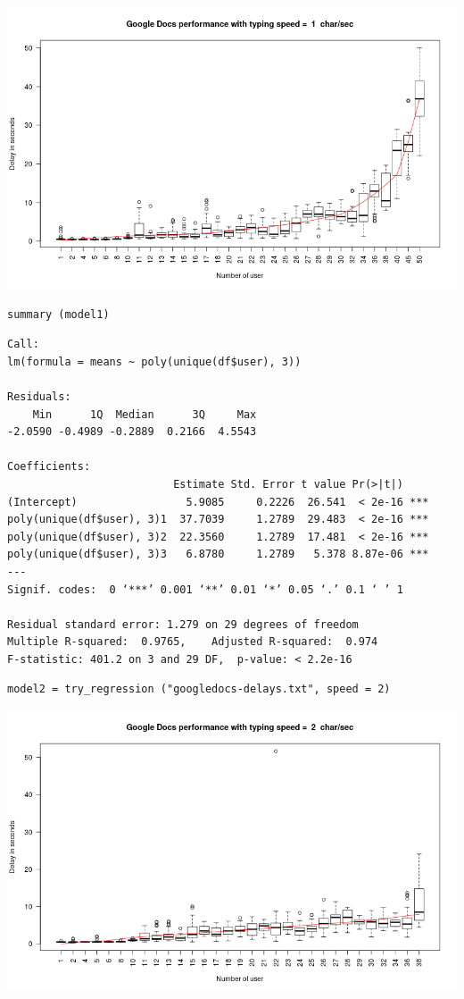 \documentclass[10pt]{article}
\begin{document}
\includegraphics[width=.9\linewidth]{figs/g1.png}

\begin{verbatim}
summary (model1)
\end{verbatim}

\begin{verbatim}
Call:
lm(formula = means ~ poly(unique(df$user), 3))

Residuals:
    Min      1Q  Median      3Q     Max 
-2.0590 -0.4989 -0.2889  0.2166  4.5543 

Coefficients:
                          Estimate Std. Error t value Pr(>|t|)    
(Intercept)                 5.9085     0.2226  26.541  < 2e-16 ***
poly(unique(df$user), 3)1  37.7039     1.2789  29.483  < 2e-16 ***
poly(unique(df$user), 3)2  22.3560     1.2789  17.481  < 2e-16 ***
poly(unique(df$user), 3)3   6.8780     1.2789   5.378 8.87e-06 ***
---
Signif. codes:  0 ‘***’ 0.001 ‘**’ 0.01 ‘*’ 0.05 ‘.’ 0.1 ‘ ’ 1

Residual standard error: 1.279 on 29 degrees of freedom
Multiple R-squared:  0.9765,	Adjusted R-squared:  0.974 
F-statistic: 401.2 on 3 and 29 DF,  p-value: < 2.2e-16
\end{verbatim}

\begin{verbatim}
model2 = try_regression ("googledocs-delays.txt", speed = 2)
\end{verbatim}

\includegraphics[width=.9\linewidth]{figs/g2.png}
\end{document}
